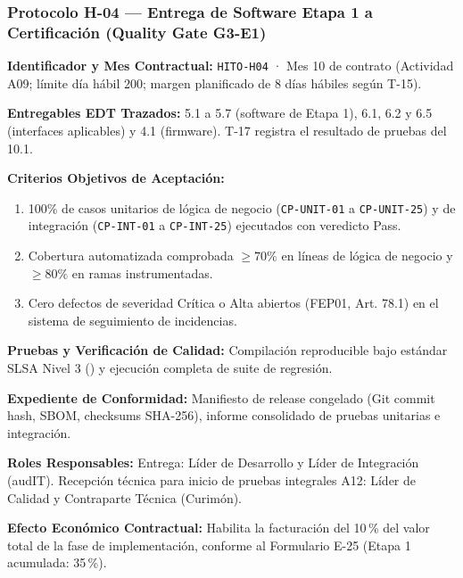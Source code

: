 \subsubsection*{Protocolo H-04 — Entrega de Software Etapa 1 a Certificación (Quality Gate G3-E1)}\label{sec:9-proto-h4}
\par\noindent\textbf{Identificador y Mes Contractual:} \texttt{HITO-H04} · Mes 10 de contrato (Actividad A09; límite día hábil 200; margen planificado de 8 días hábiles según T-15).\par
\par\noindent\textbf{Entregables EDT Trazados:} 5.1 a 5.7 (software de Etapa 1), 6.1, 6.2 y 6.5 (interfaces aplicables) y 4.1 (firmware). T-17 registra el resultado de pruebas del 10.1.\par
\par\noindent\textbf{Criterios Objetivos de Aceptación:}
\begin{enumerate}
  \item 100\% de casos unitarios de lógica de negocio (\texttt{CP-UNIT-01} a \texttt{CP-UNIT-25}) y de integración (\texttt{CP-INT-01} a \texttt{CP-INT-25}) ejecutados con veredicto Pass.
  \item Cobertura automatizada comprobada $\ge 70\%$ en líneas de lógica de negocio y $\ge 80\%$ en ramas instrumentadas.
  \item Cero defectos de severidad Crítica o Alta abiertos (FEP01, Art. 78.1) en el sistema de seguimiento de incidencias.
\end{enumerate}
\par\noindent\textbf{Pruebas y Verificación de Calidad:} Compilación reproducible bajo estándar SLSA Nivel 3 () y ejecución completa de suite de regresión.\par
\par\noindent\textbf{Expediente de Conformidad:} Manifiesto de release congelado (Git commit hash, SBOM, checksums SHA-256), informe consolidado de pruebas unitarias e integración.\par
\par\noindent\textbf{Roles Responsables:} Entrega: Líder de Desarrollo y Líder de Integración (audIT). Recepción técnica para inicio de pruebas integrales A12: Líder de Calidad y Contraparte Técnica (Curimón).\par
\par\noindent\textbf{Efecto Económico Contractual:} Habilita la facturación del 10\,\% del valor total de la fase de implementación, conforme al Formulario E-25 (Etapa 1 acumulada: 35\,\%).\par

